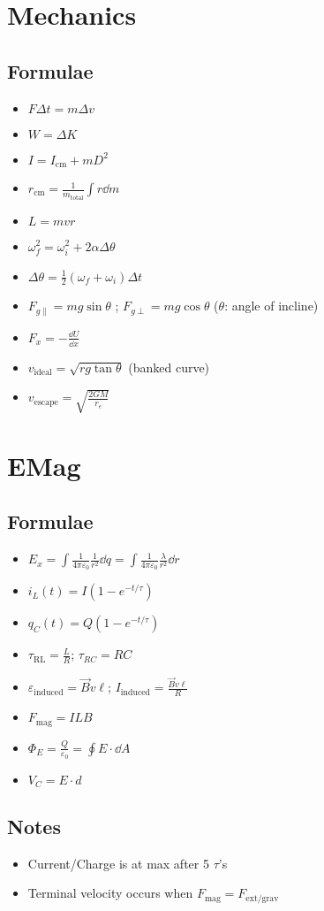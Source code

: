 \documentclass{article}
\begin{document}
  \section{Mechanics}
  \subsection{Formulae}
  \begin{itemize}
    \item $F\Delta t = m\Delta v$
    \item $W=\Delta K$
    \item $I=I_{\mathrm{cm}}+mD^2$
    \item $r_{\mathrm{cm}}=\frac{1}{m_{\mathrm{total}}}\int r\dd m$
    \item $L=mvr$
    \item $\omega_f^2=\omega_i^2+2\alpha\Delta\theta$
    \item $\Delta\theta=\frac{1}{2}(\omega_f+\omega_i)\Delta t$
    \item $F_{g\parallel}=mg\sin\theta$ ; $F_{g\perp}=mg\cos\theta$ ($\theta$: angle of incline)
    \item $F_x=-\frac{\dd U}{\dd x}$
    \item $v_{\mathrm{ideal}}=\sqrt{rg \tan\theta}$ (banked curve)
    \item $v_{\mathrm{escape}}=\sqrt{\frac{2GM}{r_e}}$
  \end{itemize}
  \section{EMag}
  \subsection{Formulae}
  \begin{itemize}
    \item $E_x=\int\frac{1}{4\pi\varepsilon_0}\frac{1}{r^2}\dd q = \int \frac{1}{4\pi\varepsilon_0}\frac{\lambda}{r^2}\dd r$
    \item $i_L(t)=I(1-e^{-t/\tau})$
    \item $q_C(t)=Q(1-e^{-t/\tau})$
    \item $\tau_{\mathrm{RL}}=\frac{L}{R}$; $\tau_{RC}=RC$
    \item $\varepsilon_{\mathrm{induced}}=\vec{B}v\ell$; $I_{\mathrm{induced}}=\frac{\vec{B}v\ell}{R}$
    \item $F_{\mathrm{mag}}=ILB$
    \item $\Phi_E=\frac{Q}{\varepsilon_0}=\oint E\cdot\dd A$
    \item $V_C=E\cdot d$
  \end{itemize}
  \subsection{Notes}
  \begin{itemize}
    \item Current/Charge is at max after 5 $\tau$'s
    \item Terminal velocity occurs when $F_{\mathrm{mag}}=F_{\mathrm{ext/grav}}$
  \end{itemize}
\end{document}
